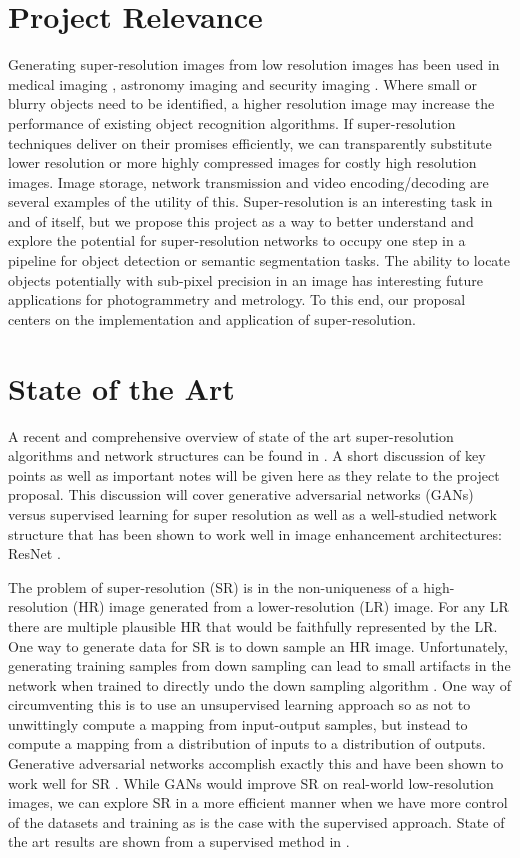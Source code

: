\documentclass{article}
\begin{document}
\section{Project Relevance}
Generating super-resolution images from low resolution images has been used in medical imaging \cite{Pham2019, Georgescu2020}, astronomy imaging \cite{zhang2019} and security imaging \cite{yang2019deep}. Where small or blurry objects need to be identified, a higher resolution image may increase the performance of existing object recognition algorithms. If super-resolution techniques deliver on their promises efficiently, we can transparently substitute lower resolution or more highly compressed images for costly high resolution images. Image storage, network transmission and video encoding/decoding  are several examples of the utility of this. Super-resolution is an interesting task in and of itself, but we propose this project as a way to better understand and explore the potential for super-resolution networks to occupy one step in a pipeline for object detection or semantic segmentation tasks. The ability to locate objects potentially with sub-pixel precision in an image has interesting future applications for photogrammetry and metrology. To this end, our proposal centers on the implementation and application of super-resolution.


\section{State of the Art}
A recent and comprehensive overview of state of the art super-resolution algorithms and network structures can be found in \cite{yang2019deep}. A short discussion of key points as well as important notes will be given here as they relate to the project proposal. This discussion will cover generative adversarial networks (GANs) versus supervised learning for super resolution as well as a well-studied network structure that has been shown to work well in image enhancement architectures: ResNet \cite{he2016deep}.

The problem of super-resolution (SR) is in the non-uniqueness of a high-resolution (HR) image generated from a lower-resolution (LR) image. For any LR there are multiple plausible HR that would be faithfully represented by the LR. One way to generate data for SR is to down sample an HR image. Unfortunately, generating training samples from down sampling can lead to small artifacts in the network when trained to directly undo the down sampling algorithm \cite{yang2019deep}. One way of circumventing this is to use an unsupervised learning approach so as not to unwittingly compute a mapping from input-output samples, but instead to compute a mapping from a distribution of inputs to a distribution of outputs. Generative adversarial networks accomplish exactly this and have been shown to work well for SR \cite{ledig2017photo}. While GANs would improve SR on real-world low-resolution images, we can explore SR in a more efficient manner when we have more control of the datasets and training as is the case with the supervised approach. State of the art results are shown from a supervised method in \cite{lim2017enhanced}.
\end{document}
